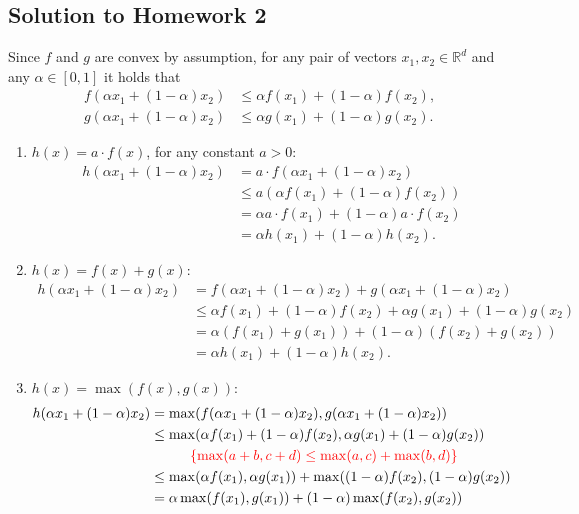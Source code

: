 \documentclass{article}
\begin{document}
  \subsection*{Solution to Homework 2}

  Since $f$ and $g$ are convex by assumption, for any pair of vectors $x_1,x_2\in\mathbb{R}^d$ and any $\alpha\in[0,1]$ it holds that
  \begin{align*}
	f(\alpha x_1 + (1-\alpha)x_2) &\leq \alpha f(x_1) + (1-\alpha) f(x_2),\\
	g(\alpha x_1 + (1-\alpha)x_2) &\leq \alpha g(x_1) + (1-\alpha) g(x_2).
  \end{align*}
  \begin{enumerate}
	\item $h(x) = a\cdot f(x)$, for any constant $a>0$:
	\begin{align*}
	h(\alpha x_1 + (1-\alpha)x_2) &= a\cdot f(\alpha x_1 + (1-\alpha)x_2)\\
	 &\leq a \left( \alpha f(x_1) + (1-\alpha) f(x_2) \right)\\
	 &= \alpha a \cdot f(x_1) + (1-\alpha) a \cdot f(x_2)\\
	 &= \alpha h(x_1) + (1-\alpha) h(x_2).
	\end{align*}
	\item $h(x) = f(x) + g(x)$:
	\begin{align*}
	h(\alpha x_1 + (1-\alpha)x_2) &= f(\alpha x_1 + (1-\alpha)x_2) + g(\alpha x_1 + (1-\alpha)x_2)\\
	 &\leq \alpha f(x_1) + (1-\alpha) f(x_2) + \alpha g(x_1) + (1-\alpha) g(x_2)\\
	 &= \alpha( f(x_1) + g(x_1) ) + (1-\alpha)( f(x_2) + g(x_2) )\\
	 &= \alpha h(x_1) + (1-\alpha) h(x_2).
	\end{align*}
	\item $h(x) = \max(f(x),g(x))$:
	\begin{align*}
	h(\alpha x_1 + (1-\alpha)x_2) &= \max(f(\alpha x_1 + (1-\alpha)x_2), g(\alpha x_1 + (1-\alpha)x_2))\\
	 &\leq \max(\alpha f(x_1) + (1-\alpha) f(x_2), \alpha g(x_1) + (1-\alpha) g(x_2))\\
	 & \hspace*{1cm} {\color{red} \{ \max(a + b, c + d) \leq \max(a, c) + \max(b, d) \}}\\
	 &\leq \max(\alpha f(x_1), \alpha g(x_1)) + \max( (1-\alpha) f(x_2), (1-\alpha) g(x_2) )\\
	 &= \alpha \max(f(x_1), g(x_1)) + (1-\alpha) \max( f(x_2), g(x_2) )\\

\end{align*}
\end{enumerate}
\end{document}
